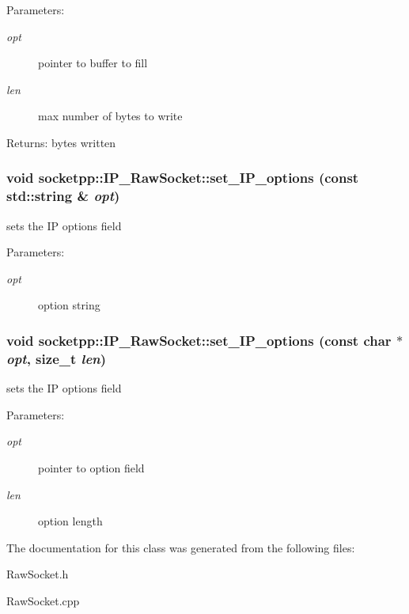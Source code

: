 \begin{Desc}
\item[Parameters:]
\begin{description}
\item[{\em opt}]pointer to buffer to fill \item[{\em len}]max number of bytes to write \end{description}
\end{Desc}
\begin{Desc}
\item[Returns:]bytes written \end{Desc}
\hypertarget{classsocketpp_1_1IP__RawSocket_9d88ecec5e362b3cf3d3dbc51d5dd0cd}{
\subsubsection[{set\_\-IP\_\-options}]{\setlength{\rightskip}{0pt plus 5cm}void socketpp::IP\_\-RawSocket::set\_\-IP\_\-options (const std::string \& {\em opt})}}
\label{classsocketpp_1_1IP__RawSocket_9d88ecec5e362b3cf3d3dbc51d5dd0cd}


sets the IP options field 

\begin{Desc}
\item[Parameters:]
\begin{description}
\item[{\em opt}]option string \end{description}
\end{Desc}
\hypertarget{classsocketpp_1_1IP__RawSocket_82c0b2c75d081bc84d8e60bf18199e65}{
\subsubsection[{set\_\-IP\_\-options}]{\setlength{\rightskip}{0pt plus 5cm}void socketpp::IP\_\-RawSocket::set\_\-IP\_\-options (const char $\ast$ {\em opt}, \/  size\_\-t {\em len})}}
\label{classsocketpp_1_1IP__RawSocket_82c0b2c75d081bc84d8e60bf18199e65}


sets the IP options field 

\begin{Desc}
\item[Parameters:]
\begin{description}
\item[{\em opt}]pointer to option field \item[{\em len}]option length \end{description}
\end{Desc}


The documentation for this class was generated from the following files:\begin{CompactItemize}
\item 
RawSocket.h\item 
RawSocket.cpp\end{CompactItemize}
